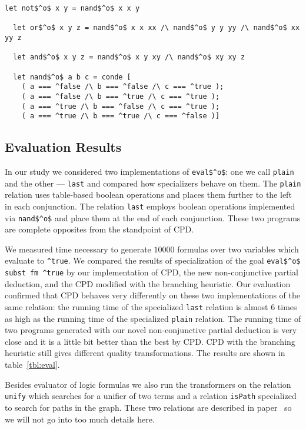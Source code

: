 \begin{lstlisting}[label={not:nando}, caption={Implementation of boolean operation via \lstinline{nand}}, captionpos=b]
  let not$^o$ x y = nand$^o$ x x y

  let or$^o$ x y z = nand$^o$ x x xx /\ nand$^o$ y y yy /\ nand$^o$ xx yy z

  let and$^o$ x y z = nand$^o$ x y xy /\ nand$^o$ xy xy z

  let nand$^o$ a b c = conde [
    ( a === ^false /\ b === ^false /\ c === ^true );
    ( a === ^false /\ b === ^true /\ c === ^true );
    ( a === ^true /\ b === ^false /\ c === ^true );
    ( a === ^true /\ b === ^true /\ c === ^false )]
\end{lstlisting}

\subsection{Evaluation Results}

In our study we considered two implementations of \lstinline{eval$^o$}: one we call \lstinline{plain} and the other --- \lstinline{last} and compared how specializers behave on them.
The \lstinline{plain} relation uses table-based boolean operations and places them further to the left in each conjunction.
The relation \lstinline{last} employs boolean operations implemented via \lstinline{nand$^o$} and place them at the end of each conjunction.
These two programs are complete opposites from the standpoint of CPD.

We measured time necessary to generate $10000$ formulas over two variables which evaluate to \lstinline{^true}.
We compared the results of specialization of the goal \lstinline{eval$^o$ subst fm ^true} by our implementation of CPD, the new non-conjunctive partial deduction, and the CPD modified with the branching heuristic.
Our evaluation confirmed that CPD behaves very differently on these two implementations of the same relation: the running time of the specialized \lstinline{last} relation is almost 6 times as high as the running time of the specialized \lstinline{plain} relation.
The running time of two programs generated with our novel non-conjunctive partial deduction is very close and it is a little bit better than the best by CPD.
CPD with the branching heuristic still gives different quality transformations.
The results are shown in table~\ref{tbl:eval}.

Besides evaluator of logic formulas we also run the transformers on the relation \lstinline{unify} which searches for a unifier of two terms and a relation \lstinline{isPath} specialized to search for paths in the graph.
These two relations are described in paper~\cite{lozov2019relational} so we will not go into too much details here.

